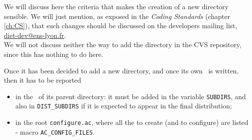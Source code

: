 We will discuss here the criteria that makes the creation of a new directory
sensible. We will just mention, as exposed in the \textit{Coding Standards}
(chapter \ref{ch:CS}), that such changes should be discussed on the developers
mailing list, \url{diet-dev@ens-lyon.fr}.
\\
We will not discuss neither the way to add the directory in the CVS repository,
since this has nothing to do here.

Once it has been decided to add a new directory, and once its own \makeam\ is
written, then it has to be reported
\begin{itemize}
\item in the \makeam\ of its parent directory: it must be added in the variable
  \texttt{SUBDIRS}, and also in \texttt{DIST\_SUBDIRS} if it is expected to
  appear in the final distribution;
\item in the root \texttt{configure.ac}, where all the \makein to create (and to
  configure) are listed - macro \texttt{AC\_CONFIG\_FILES}.
\end{itemize}


